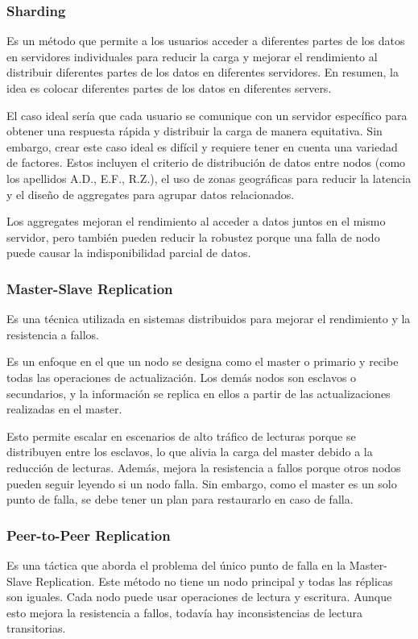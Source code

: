 \documentclass{article}
\begin{document}
		\subsubsection{Sharding}\label{sec:sharding_nosql}
		Es un método que permite a los usuarios acceder a diferentes partes de los datos en servidores individuales para reducir la carga y mejorar el rendimiento al distribuir diferentes partes de los datos en diferentes servidores. En resumen, la idea es colocar diferentes partes de los datos en diferentes servers.
		
		El caso ideal sería que cada usuario se comunique con un servidor específico para obtener una respuesta rápida y distribuir la carga de manera equitativa. Sin embargo, crear este caso ideal es difícil y requiere tener en cuenta una variedad de factores. Estos incluyen el criterio de distribución de datos entre nodos (como los apellidos A.D., E.F., R.Z.), el uso de zonas geográficas para reducir la latencia y el diseño de aggregates para agrupar datos relacionados.
		
		Los aggregates mejoran el rendimiento al acceder a datos juntos en el mismo servidor, pero también pueden reducir la robustez porque una falla de nodo puede causar la indisponibilidad parcial de datos.
		
		
		\subsubsection{Master-Slave Replication}
		Es una técnica utilizada en sistemas distribuidos para mejorar el rendimiento y la resistencia a fallos.
		
		Es un enfoque en el que un nodo se designa como el master o primario y recibe todas las operaciones de actualización. Los demás nodos son esclavos o secundarios, y la información se replica en ellos a partir de las actualizaciones realizadas en el master.
		
		Esto permite escalar en escenarios de alto tráfico de lecturas porque se distribuyen entre los esclavos, lo que alivia la carga del master debido a la reducción de lecturas. Además, mejora la resistencia a fallos porque otros nodos pueden seguir leyendo si un nodo falla. Sin embargo, como el master es un solo punto de falla, se debe tener un plan para restaurarlo en caso de falla.
		
		\subsubsection{Peer-to-Peer Replication}
		Es una táctica que aborda el problema del único punto de falla en la Master-Slave Replication. Este método no tiene un nodo principal y todas las réplicas son iguales. Cada nodo puede usar operaciones de lectura y escritura. Aunque esto mejora la resistencia a fallos, todavía hay inconsistencias de lectura transitorias.
		
\end{document}
